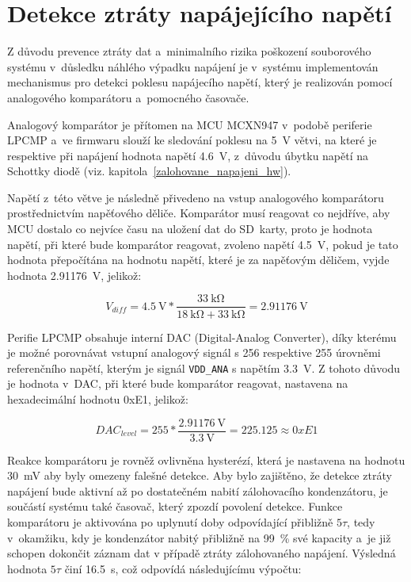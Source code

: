 \section{Detekce ztráty napájejícího napětí}
\label{detekce_ztraty_napajeciho_napeti}
Z důvodu prevence ztráty dat a~minimalního rizika poškození souborového systému v~důsledku náhlého výpadku napájení je v~systému implementován mechanismus pro detekci poklesu napájecího napětí, který je realizován pomocí analogového komparátoru a~pomocného časovače.  

Analogový komparátor je přítomen na MCU MCXN947 v~podobě periferie LPCMP a~ve firmwaru slouží ke sledování poklesu na \SI{5}{\volt} větvi, na které je respektive při napájení hodnota napětí \SI{4.6}{\volt}, z~důvodu úbytku napětí na Schottky diodě (viz. kapitola~\ref{zalohovane_napajeni_hw}).

\newpage


Napětí z~této větve je následně přivedeno na vstup analogového komparátoru prostřednictvím napěťového děliče. Komparátor musí reagovat co nejdříve, aby MCU dostalo co nejvíce času na uložení dat do SD~karty, proto je hodnota napětí, při které bude komparátor reagovat, zvoleno napětí \SI{4.5}{\volt}, pokud je tato hodnota přepočítána na hodnotu napětí, které je za napěťovým děličem, vyjde hodnota \SI{2.91176}{\volt}, jelikož:

\[
    V_{diff} = \SI{4.5}{\volt} * \frac{\SI{33}{\kilo\ohm}}{\SI{18}{\kilo\ohm} + \SI{33}{\kilo\ohm}} = \SI{2.91176}{\volt}
\]

Perifie LPCMP obsahuje interní DAC (Digital-Analog Converter), díky kterému je možné porovnávat vstupní analogový signál s 256 respektive 255 úrovněmi referenčního napětí, kterým je signál \texttt{VDD\_ANA} s napětím \SI{3.3}{\volt}. Z tohoto důvodu je hodnota v~DAC, při které bude komparátor reagovat, nastavena na hexadecimální hodnotu 0xE1, jelikož:

\[
    DAC_{level} = 255 * \frac{\SI{2.91176}{\volt}}{\SI{3.3}{\volt}} = 225.125 \approx  0xE1
\]

Reakce komparátoru je rovněž ovlivněna hysterézí, která je nastavena na hodnotu \SI{30}{\milli\volt} aby byly omezeny falešné detekce. Aby bylo zajištěno, že detekce ztráty napájení bude aktivní až po dostatečném nabití zálohovacího kondenzátoru, je součástí systému také časovač, který zpozdí povolení detekce. Funkce komparátoru je aktivována po uplynutí doby odpovídající přibližně $5\tau$, tedy v~okamžiku, kdy je kondenzátor nabitý přibližně na 99~\% své kapacity a~je již schopen dokončit záznam dat v případě ztráty zálohovaného napájení. Výsledná hodnota $5\tau$ činí \SI{16.5}{\second}, což odpovídá následujícímu výpočtu:

